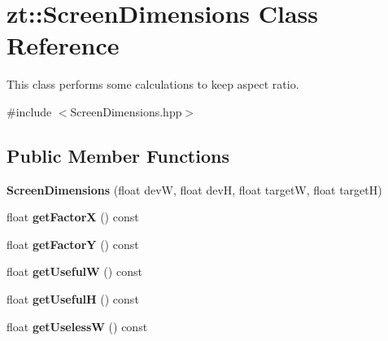 \hypertarget{classzt_1_1_screen_dimensions}{}\section{zt\+:\+:Screen\+Dimensions Class Reference}
\label{classzt_1_1_screen_dimensions}


This class performs some calculations to keep aspect ratio.  




{\ttfamily \#include $<$Screen\+Dimensions.\+hpp$>$}

\subsection*{Public Member Functions}
\begin{DoxyCompactItemize}
\item 
\mbox{\label{classzt_1_1_screen_dimensions_a5b5307a2f0d32b58335c4c50b0ba1e7a}} 
{\bfseries Screen\+Dimensions} (float devW, float devH, float targetW, float targetH)
\item 
\mbox{\label{classzt_1_1_screen_dimensions_af0186d951b371f89c24d8a6905565f16}} 
float {\bfseries get\+FactorX} () const
\item 
\mbox{\label{classzt_1_1_screen_dimensions_acd0361d35a6963e47c7dabc6634b2988}} 
float {\bfseries get\+FactorY} () const
\item 
\mbox{\label{classzt_1_1_screen_dimensions_a2d64bda9f317b6b44197081de80d8b82}} 
float {\bfseries get\+UsefulW} () const
\item 
\mbox{\label{classzt_1_1_screen_dimensions_aecd1f41f69045fa82c030d529523a874}} 
float {\bfseries get\+UsefulH} () const
\item 
\mbox{\label{classzt_1_1_screen_dimensions_a8a177586d4f5fe06f159af91860d7279}} 
float {\bfseries get\+UselessW} () const
\item 
\mbox{\label{classzt_1_1_screen_dimensions_a01ca470ee6b640674e5043cf29e82be7}} 

\end{DoxyCompactItemize}

